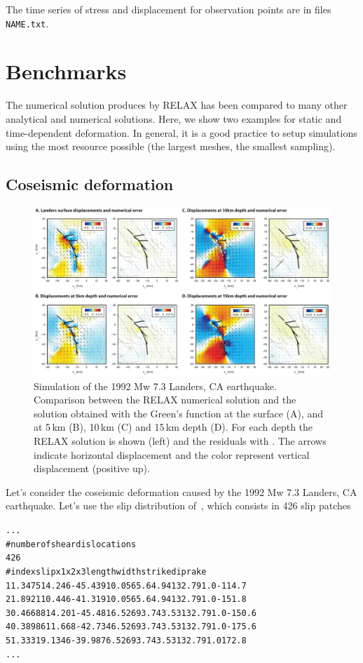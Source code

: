 \documentclass[10pt]{article}
\begin{document}
The time series of stress and displacement for observation points are in files \verb'NAME.txt'.

\pagebreak
\section{Benchmarks}

The numerical solution produces by RELAX has been compared to many other analytical and numerical solutions. Here, we show two examples for static and time-dependent deformation. In general, it is a good practice to setup simulations using the most resource possible (the largest meshes, the smallest sampling).

\subsection{Coseismic deformation}
%
\begin{figure}[h]
\centering
\includegraphics[width=\textwidth]{bm_landers.pdf}
\caption{\small Simulation of the 1992 Mw 7.3 Landers, CA earthquake. Comparison between the RELAX numerical solution and the solution obtained with the \cite{okada92} Green's function at the surface (A), and at 5\,km (B), 10\,km (C) and 15\,km depth (D). For each depth the RELAX solution is shown (left) and the residuals with \cite{okada92}. The arrows indicate horizontal displacement and the color represent vertical displacement (positive up). }
\label{fig:bm_landers}
\end{figure}
%
Let's consider the coseismic deformation caused by the 1992 Mw 7.3 Landers, CA earthquake. Let's use the slip distribution of~\citep{fi04c}, which consists in 426 slip patches
\begin{alltt}
...
# number of shear dislocations
{\color{orange}426}
# index slip x1 x2 x3 length width strike dip rake
{\color{orange}1 1.3475 14.246 -45.439 10.056 5.6 4.94 132.7 91.0 -114.7
2 1.8921 10.446 -41.319 10.056 5.6 4.94 132.7 91.0 -151.8
3 0.46688 14.201 -45.481 6.5269 3.74 3.53 132.7 91.0 -150.6
4 0.38986 11.668 -42.734 6.5269 3.74 3.53 132.7 91.0 -175.6
5 1.3331 9.1346 -39.987 6.5269 3.74 3.53 132.7 91.0 172.8}
...
\end{alltt}
\end{document}
